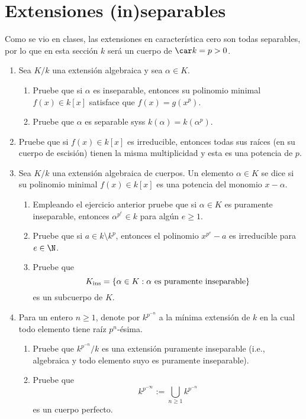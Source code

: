 \documentclass[11pt, reqno]{amsart}
\begin{document}
\section{Extensiones (in)separables}
Como se vio en clases, las extensiones en característica cero son todas separables, por lo que en esta sección $k$ será
un cuerpo de $\car k = p > 0$.
\begin{enumerate}[resume]
	\item Sea $K/k$ una extensión algebraica y sea $\alpha \in K$.
		\begin{enumerate}
			\item Pruebe que si $\alpha$ es inseparable, entonces su polinomio minimal $f(x) \in k[x]$
				satisface que $f(x) = g(x^p)$.
			\item Pruebe que $\alpha$ es separable syss $k(\alpha) = k(\alpha^p)$.
		\end{enumerate}
	\item Pruebe que si $f(x) \in k[x]$ es irreducible, entonces todas sus raíces (en su cuerpo de escisión) tienen
		la misma multiplicidad y esta es una potencia de $p$.
	\item Sea $K/k$ una extensión algebraica de cuerpos.
		Un elemento $\alpha \in K$ se dice  si su polinomio minimal $f(x) \in k[x]$
		es una potencia del monomio $x - \alpha$.
		\begin{enumerate}
			\item\lookright
				Empleando el ejercicio anterior pruebe que si $\alpha \in K$ es puramente inseparable,
				entonces $\alpha^{p^e} \in k$ para algún $e \ge 1$.
			\item Pruebe que si $a \in k \setminus k^p$, entonces el polinomio $x^{p^e} - a$ es irreducible
				para $e \in \N$.
			\item Pruebe que
				\[
					K_{\rm ins} = \{ \alpha \in K : \alpha \text{ es puramente inseparable} \}
				\]
				es un subcuerpo de $K$.
		\end{enumerate}
	\item Para un entero $n \ge 1$, denote por $k^{p^{-n}}$ a la mínima extensión de $k$ en la cual todo elemento
		tiene raíz $p^n$-ésima.
		\begin{enumerate}
			\item Pruebe que $k^{p^{-n}}/k$ es una extensión puramente inseparable (i.e., algebraica y todo
				elemento suyo es puramente inseparable).
			\item \lookup
				Pruebe que
				\[
					k^{p^{-\infty}} := \bigcup_{n\ge 1} k^{p^{-n}}
				\]
				es un cuerpo perfecto.
		\end{enumerate}
\end{enumerate}
\end{document}
